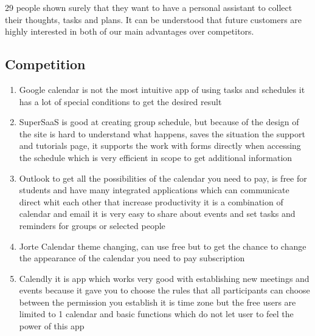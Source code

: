 \par 29 people shown surely that they want to have a personal assistant to collect their thoughts, tasks and plans. It can be understood that future customers are highly interested in both of our main advantages over competitors.

\subsection{Competition}
\par 
\begin{enumerate}
	\item 	Google calendar is not the most intuitive app of using tasks and schedules it has a lot of special conditions to get the desired result 
	
	\item SuperSaaS is good at creating group schedule, but because of the design of the site is hard to understand what happens, saves the situation the support and tutorials page, it supports the work with forms directly when accessing the schedule which is very efficient in scope to get additional information  

	\item Outlook to get all the possibilities of the calendar you need to pay, is free for students and have many integrated applications which can communicate direct whit each other that increase productivity it is a combination of calendar and email it is very easy to share about events and set tasks and reminders for groups or selected people 

	\item Jorte Calendar theme changing, can use free but to get the chance to change the appearance of the calendar you need to pay subscription  

	\item Calendly it is app which works very good with establishing new meetings and events because it gave you to choose the rules that all participants can choose between the permission you establish it is time zone but the free users are limited to 1 calendar and basic functions which do not let user to feel the power of this app  
\end{enumerate}				

\clearpage